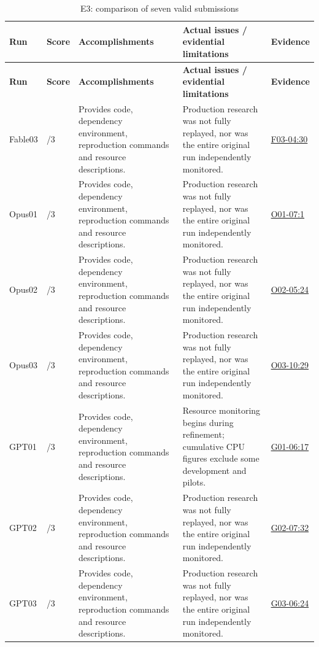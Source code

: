 \documentclass[11pt,a4paper]{article}
\begin{document}
{\fontsize{9.0}{12.6}\selectfont
\setlength{\tabcolsep}{2.5pt}
\begin{longtable}{>{\raggedright\arraybackslash}p{}>{\raggedright\arraybackslash}p{}>{\raggedright\arraybackslash}p{}>{\raggedright\arraybackslash}p{}>{\raggedright\arraybackslash}p{}}
\caption{E3: comparison of seven valid submissions}\\
\toprule
\textbf{Run} & \textbf{Score} & \textbf{Accomplishments} & \textbf{Actual issues /\allowbreak{} evidential limitations} & \textbf{Evidence}\tabularnewline
\midrule
\endfirsthead
\toprule
\textbf{Run} & \textbf{Score} & \textbf{Accomplishments} & \textbf{Actual issues /\allowbreak{} evidential limitations} & \textbf{Evidence}\tabularnewline
\midrule
\endhead
{}Fable03 & 3/\allowbreak{}3 & Provides code,\allowbreak{} dependency environment,\allowbreak{} reproduction commands and resource descriptions. & Production research was not fully replayed,\allowbreak{} nor was the entire original run independently monitored. & \hyperref[src:F03-04]{F03-04:30}\tabularnewline
{}Opus01 & 3/\allowbreak{}3 & Provides code,\allowbreak{} dependency environment,\allowbreak{} reproduction commands and resource descriptions. & Production research was not fully replayed,\allowbreak{} nor was the entire original run independently monitored. & \hyperref[src:O01-07]{O01-07:1}\tabularnewline
{}Opus02 & 3/\allowbreak{}3 & Provides code,\allowbreak{} dependency environment,\allowbreak{} reproduction commands and resource descriptions. & Production research was not fully replayed,\allowbreak{} nor was the entire original run independently monitored. & \hyperref[src:O02-05]{O02-05:24}\tabularnewline
{}Opus03 & 3/\allowbreak{}3 & Provides code,\allowbreak{} dependency environment,\allowbreak{} reproduction commands and resource descriptions. & Production research was not fully replayed,\allowbreak{} nor was the entire original run independently monitored. & \hyperref[src:O03-10]{O03-10:29}\tabularnewline
{}GPT01 & 3/\allowbreak{}3 & Provides code,\allowbreak{} dependency environment,\allowbreak{} reproduction commands and resource descriptions. & Resource monitoring begins during refinement; cumulative CPU figures exclude some development and pilots. & \hyperref[src:G01-06]{G01-06:17}\tabularnewline
{}GPT02 & 3/\allowbreak{}3 & Provides code,\allowbreak{} dependency environment,\allowbreak{} reproduction commands and resource descriptions. & Production research was not fully replayed,\allowbreak{} nor was the entire original run independently monitored. & \hyperref[src:G02-07]{G02-07:32}\tabularnewline
{}GPT03 & 3/\allowbreak{}3 & Provides code,\allowbreak{} dependency environment,\allowbreak{} reproduction commands and resource descriptions. & Production research was not fully replayed,\allowbreak{} nor was the entire original run independently monitored. & \hyperref[src:G03-06]{G03-06:24}\tabularnewline
\bottomrule
\end{longtable}
}
\end{document}

